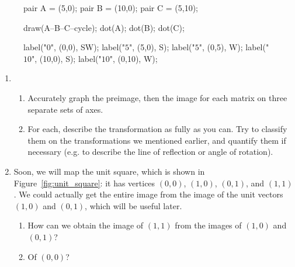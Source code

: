 \documentclass[../textbook.tex]{subfiles}
\begin{document}
\begin{figure}[h]
\begin{center}
\begin{minipage}[c]{0.35\textwidth}
\begin{center}
\begin{minipage}[b]{\textwidth}
\begin{asy}[width=0.7\textwidth]
						pair A = (5,0);
						pair B = (10,0);
						pair C = (5,10);

						draw(A--B--C--cycle);
						dot(A);
						dot(B);
						dot(C);

						label("$0$", (0,0), SW);
						label("$5$", (5,0), S);
						label("$5$", (0,5), W);
						label("$10$", (10,0), S);
						label("$10$", (0,10), W);
					\end{asy}
				\end{minipage}
			\end{center}
			\vspace*{-2\baselineskip}
			\begin{center}
				\begin{minipage}[t]{\textwidth}
					\label{fig:preimage_tri}
				\end{minipage}
			\end{center}
		\end{minipage}
	\end{center}
	\vspace*{-2\baselineskip}
\end{figure}

\begin{enumerate}
\item[]
\begin{enumerate}
\setcounter{enumii}{\value{another_name}}
\item Accurately graph the preimage, then the image for each matrix on three separate sets of axes.
\item For each, describe the transformation as fully as you can. Try to classify them on the transformations we mentioned earlier, and quantify them if necessary (e.g. to describe the line of reflection or angle of rotation).
\end{enumerate}
\setcounter{enumi}{\value{problem_i}}
\item Soon, we will map the unit square, which is shown in Figure~\ref{fig:unit_square}: it has vertices $(0,0)$, $(1,0)$, $(0,1)$, and $(1,1)$. We could actually get the entire image from the image of the unit vectors $(1,0)$ and $(0,1)$, which will be useful later. %
\begin{enumerate}
\item How can we obtain the image of $(1,1)$ from the images of $(1,0)$ and $(0,1)$?
\item Of $(0,0)$?
\end{enumerate}
\setcounter{problem_i}{\value{enumi}}
\end{enumerate}
\end{document}
